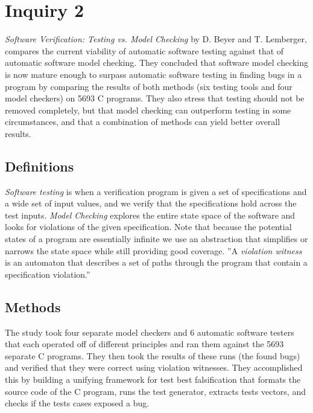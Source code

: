 \documentclass[a4paper]{article}
\begin{document}
\section{Inquiry 2}
\emph{Software Verification: Testing vs. Model Checking} by D. Beyer and T. Lemberger, compares the current viability of automatic software testing against that of automatic software model checking. They concluded that software model checking is now mature enough to surpass automatic software testing in finding bugs in a program by comparing the results of both methods (six testing tools and four model checkers) on 5693 C programs. They also stress that testing should not be removed completely, but that  model checking can outperform testing in some circumstances, and that a combination of methods can yield better overall results.

\subsection{Definitions}
\emph{Software testing} is when a verification program is given a set of specifications and a wide set of input values, and we verify that the specifications hold across the test inputs. \emph{Model Checking} explores the entire state space of the software and looks for violations of the given specification. Note that because the potential states of a program are essentially infinite we use an abstraction that simplifies or narrows the state space while still providing good coverage. ''A \emph{violation witness} is an automaton that describes a set of paths through the program that contain a specification violation.''

\subsection{Methods}
The study took four separate model checkers and 6 automatic software testers that each operated off of different principles and ran them against the 5693 separate C programs. They then took the results of these runs (the found bugs) and verified that they were correct using violation witnesses. They accomplished this by building a unifying framework for test best falsification that formats the source code of the C program, runs the test generator, extracts tests vectors, and checks if the tests cases exposed a bug. 
\end{document}
